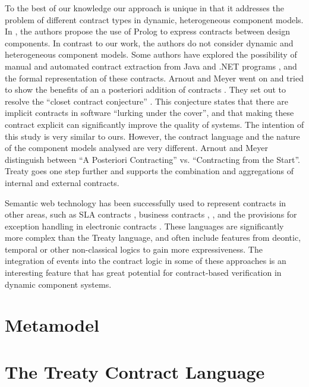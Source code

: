 \documentclass{llncs}
\begin{document}
To the best of our knowledge our approach is unique in that it addresses the problem of different contract types in dynamic, heterogeneous component models. In \cite{Dong2003}, the authors propose the use of Prolog to express contracts between design components. In contrast to our work, the authors do not consider dynamic and heterogeneous component models. Some authors have explored the possibility of manual and automated contract extraction from Java \cite{Henkel03,MilanovicMalek2004} and .NET programs \cite{ArnoutMeyer2003a}, and the formal representation of these contracts. Arnout and Meyer went on and tried to show the benefits of an a posteriori addition of contracts \cite{ArnoutMeyer2003b}. They set out to resolve the ``closet contract
conjecture'' \cite{ArnoutMeyer2003b}. This conjecture states that there are implicit contracts in software ``lurking under the cover'', and that making
these contract explicit can significantly improve the quality of systems. The intention of this study is very similar to ours. However, the contract language and the nature of the component models analysed are very different. Arnout and Meyer distinguish between ``A Posteriori Contracting'' vs. ``Contracting from the Start''. Treaty goes one step further and supports the combination and aggregations of internal and external contracts. 

Semantic web technology has been successfully used to represent contracts in other areas, such as SLA contracts \cite{PaschkeDietrich2005}, business
contracts \cite{Linington04}, \cite{Governatori06} ,\cite{Governatori05} and the provisions for exception handling in electronic contracts \cite{SweetDeal}. These languages are significantly more complex than the Treaty language, and often include features from deontic, temporal or other non-classical logics to gain more expressiveness. The integration of events into the contract logic in some of these approaches is an interesting feature that has great potential for contract-based verification in dynamic component systems. 

\section{Metamodel}




\section{The Treaty Contract Language}
\end{document}

